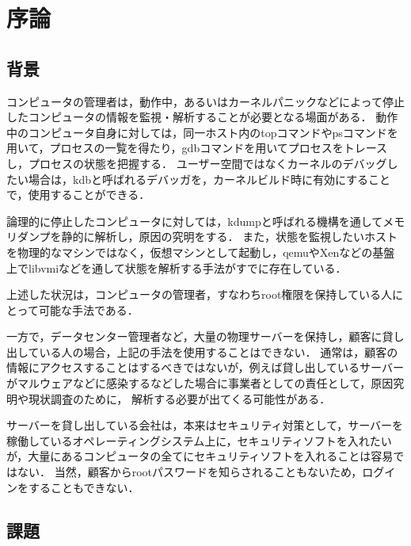 \chapter{序論}
\label{chap:introduction}

\section{背景}
\label{section:background}

コンピュータの管理者は，動作中，あるいはカーネルパニックなどによって停止したコンピュータの情報を監視・解析することが必要となる場面がある．
動作中のコンピュータ自身に対しては，同一ホスト内のtopコマンドやpsコマンドを用いて，プロセスの一覧を得たり，gdbコマンドを用いてプロセスをトレースし，プロセスの状態を把握する．
ユーザー空間ではなくカーネルのデバッグしたい場合は，kdbと呼ばれるデバッガを，カーネルビルド時に有効にすることで，使用することができる．

論理的に停止したコンピュータに対しては，kdumpと呼ばれる機構を通してメモリダンプを静的に解析し，原因の究明をする．
また，状態を監視したいホストを物理的なマシンではなく，仮想マシンとして起動し，qemuやXenなどの基盤上でlibvmiなどを通して状態を解析する手法がすでに存在している．

上述した状況は，コンピュータの管理者，すなわちroot権限を保持している人にとって可能な手法である．

一方で，データセンター管理者など，大量の物理サーバーを保持し，顧客に貸し出している人の場合，上記の手法を使用することはできない．
通常は，顧客の情報にアクセスすることはするべきではないが，例えば貸し出しているサーバーがマルウェアなどに感染するなどした場合に事業者としての責任として，原因究明や現状調査のために，
解析する必要が出てくる可能性がある．

サーバーを貸し出している会社は，本来はセキュリティ対策として，サーバーを稼働しているオペレーティングシステム上に，セキュリティソフトを入れたいが，大量にあるコンピュータの全てにセキュリティソフトを入れることは容易ではない．
当然，顧客からrootパスワードを知らされることもないため，ログインをすることもできない．


\section{課題}
\label{section:problem}

